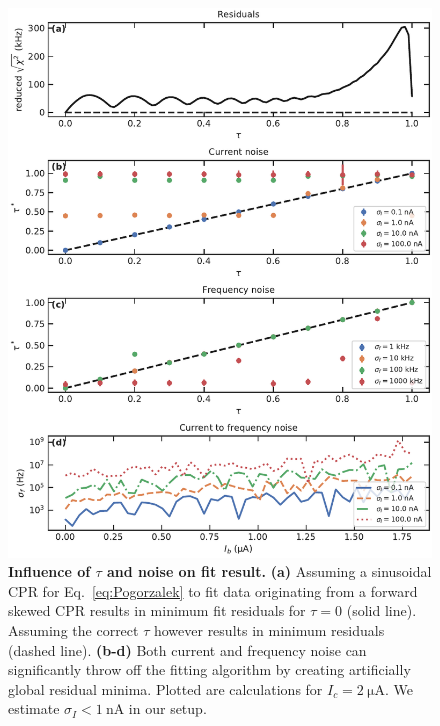 \begin{figure}
	\centering
	\includegraphics[width=\linewidth]{chapter-gJJ-CPR/figs/SMFigure-noise}
	\caption{
		\textbf{Influence of $\tau$ and noise on fit result.}
		\textbf{(a)} Assuming a sinusoidal CPR for Eq.~\ref{eq:Pogorzalek} to fit data originating from a forward skewed CPR results in minimum fit residuals for $\tau=0$ (solid line).
		Assuming the correct $\tau$ however results in minimum residuals (dashed line).
		\textbf{(b-d)} Both current and frequency noise can significantly throw off the fitting algorithm by creating artificially global residual minima.
		Plotted are calculations for $I_c=\SI{2}{\micro\ampere}$.
		We estimate $\sigma_I<\SI{1}{\nano\ampere}$ in our setup.
	}
	\label{fig:SMres}
\end{figure}


